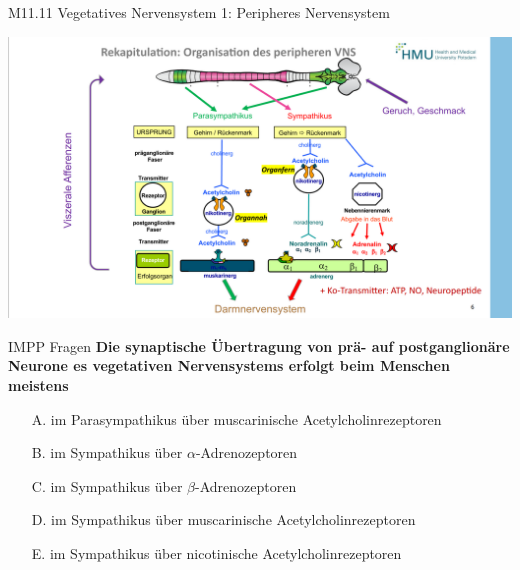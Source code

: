 \documentclass{beamer}
\begin{document}
\begin{frame}{M11.11 Vegetatives Nervensystem 1: Peripheres Nervensystem}

\begin{center}
    \includegraphics[width=\textwidth]{peripheres_VNS.png}
\end{center}

    
\end{frame}







\begin{frame}{IMPP Fragen}
\textbf{Die synaptische Übertragung von prä- auf postganglionäre Neurone es vegetativen Nervensystems erfolgt beim Menschen meistens} \\[0.2 cm]

\begin{itemize}
\item[A.] im Parasympathikus über muscarinische Acetylcholinrezeptoren
\item[B.] im Sympathikus über \(\alpha\)-Adrenozeptoren
\item[C.] im Sympathikus über \(\beta\)-Adrenozeptoren
\item[D.] im Sympathikus über muscarinische Acetylcholinrezeptoren
\item[E.] im Sympathikus über nicotinische Acetylcholinrezeptoren %

\end{itemize}
\end{frame}
\end{document}
